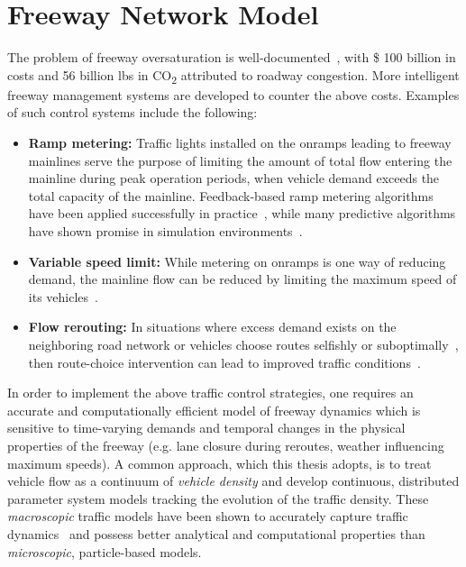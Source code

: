 \chapter{Freeway Network Model}
\label{chapter:freeway-network-model}

The problem of freeway oversaturation is well-documented~\cite{schrank2012tti}, with \$ 100 billion in costs and 56 billion lbs in CO\textsubscript{2} attributed to roadway congestion. More intelligent freeway management systems are developed to counter the above costs. Examples of such control systems include the following:

\begin{itemize}
  	\item \textbf{Ramp metering: } Traffic lights installed on the onramps leading to freeway mainlines serve the purpose of limiting the amount of total flow entering the mainline during peak operation periods, when vehicle demand exceeds the total capacity of the mainline. Feedback-based ramp metering algorithms have been applied successfully in practice~\cite{papageorgiou1997alinea,Papageorgiou1991,Papamichail}, while many predictive algorithms have shown promise in simulation environments~\cite{Reilly2013b,gomes2006optimal,Kotsialos2004}.
  	\item \textbf{Variable speed limit: } While metering on onramps is one way of reducing demand, the mainline flow can be reduced by limiting the maximum speed of its vehicles~\cite{Muralidharana}.
  	\item \textbf{Flow rerouting: } In situations where excess demand exists on the neighboring road network or vehicles choose routes selfishly or suboptimally~\cite{krichenetac,jebbari2013stackelberg,Krichene2012a,Roughgarden2003}, then route-choice intervention can lead to improved traffic conditions~\cite{Samaranayake2014,ziliaskopoulos2000linear}.
\end{itemize}

In order to implement the above traffic control strategies, one requires an accurate and computationally efficient model of freeway dynamics which is sensitive to time-varying demands and temporal changes in the physical properties of the freeway (e.g. lane closure during reroutes, weather influencing maximum speeds).
A common approach, which this thesis adopts, is to treat vehicle flow as a continuum of \emph{vehicle density} and develop continuous, distributed parameter system models tracking the evolution of the traffic density. These \emph{macroscopic} traffic models have been shown to accurately capture traffic dynamics~\cite{papageorgiou1989macroscopic} and possess better analytical and computational properties than \emph{microscopic}, particle-based models.

